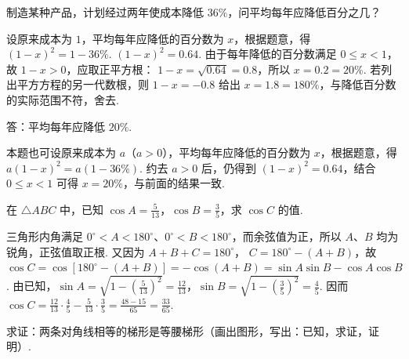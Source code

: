 \begin{problem}
制造某种产品，计划经过两年使成本降低 \( 36\% \)，问平均每年应降低百分之几？
\end{problem}

\begin{solution}
设原来成本为 \(1\)，平均每年应降低的百分数为 \( x \)，根据题意，得
\( \left( 1-x \right)^2=1-36\% \).
\( \left( 1-x \right)^2=0.64 \).
由于每年降低的百分数满足 \(0\leqslant x<1\)，故 \(1-x>0\)，应取正平方根：
\(1-x=\sqrt{0.64}=0.8\)，所以 \(x=0.2=20\%\). 若列出平方方程的另一代数根，则 \(1-x=-0.8\) 给出 \(x=1.8=180\%\)，与降低百分数的实际范围不符，舍去.

答：平均每年应降低 \( 20\% \).

本题也可设原来成本为 \( a \)（\( a>0 \)），平均每年应降低的百分数为 \( x \)，根据题意，得 \( a\left( 1-x \right)^2=a\left( 1-36\% \right) \). 约去 \(a>0\) 后，仍得到
\(\left(1-x\right)^2=0.64\)，结合 \(0\leqslant x<1\) 可得 \(x=20\%\)，与前面的结果一致.
\end{solution}

\begin{problem}
在 \( \triangle ABC \) 中，已知 \( \cos A=\frac{5}{13} \)，\( \cos B=\frac{3}{5} \)，求 \( \cos C \) 的值.
\end{problem}

\begin{solution}
三角形内角满足 \(0^\circ<A<180^\circ\)、\(0^\circ<B<180^\circ\)，而余弦值为正，所以 \(A\)、\(B\) 均为锐角，正弦值取正根. 又因为 \(A+B+C=180^\circ\)，
\(C=180^\circ-(A+B)\)，故
\(\cos C=\cos[180^\circ-(A+B)]=-\cos(A+B)=\sin A\sin B-\cos A\cos B\).
由已知，\(\sin A=\sqrt{1-(\frac{5}{13})^2}=\frac{12}{13}\)，\(\sin B=\sqrt{1-(\frac{3}{5})^2}=\frac{4}{5}\). 因而
\(\cos C=\frac{12}{13}\cdot\frac45-\frac5{13}\cdot\frac35=\frac{48-15}{65}=\frac{33}{65}\).
\end{solution}

\begin{problem}
求证：两条对角线相等的梯形是等腰梯形（画出图形，写出：已知，求证，证明）.
\end{problem}

